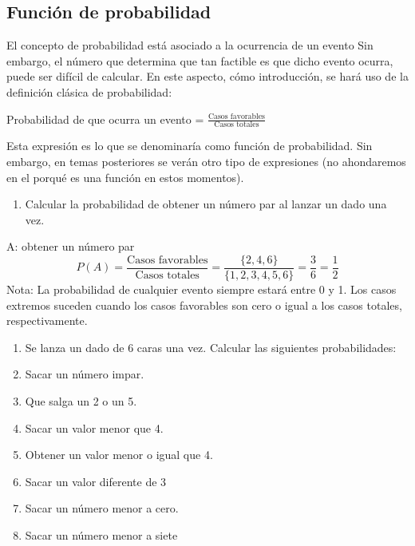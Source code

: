 \documentclass[
]{book}
\providecommand{\tightlist}{%
  \setlength{\itemsep}{0pt}\setlength{\parskip}{0pt}}
\begin{document}
\hypertarget{funciuxf3n-de-probabilidad}{%
\subsection{Función de probabilidad}\label{funciuxf3n-de-probabilidad}}

El concepto de probabilidad está asociado a la ocurrencia de un evento Sin embargo, el número que determina que tan factible es que dicho evento ocurra, puede ser difícil de calcular. En este aspecto, cómo introducción, se hará uso de la definición clásica de probabilidad:

Probabilidad de que ocurra un evento = \(\frac{\text{Casos favorables}}{\text{Casos totales}}\)

Esta expresión es lo que se denominaría como función de probabilidad. Sin embargo, en temas posteriores se verán otro tipo de expresiones (no ahondaremos en el porqué es una función en estos momentos).

\begin{enumerate}
\def\labelenumi{\arabic{enumi}.}
\tightlist
\item
  Calcular la probabilidad de obtener un número par al lanzar un dado una vez.
\end{enumerate}

A: obtener un número par
\[P(A) = \frac{\text{Casos favorables}}{\text{Casos totales}} = \frac{\lbrace 2,4,6 \rbrace}{\lbrace 1,2,3,4,5,6 \rbrace} = \frac{3}{6}= \frac{1}{2}\]
Nota: La probabilidad de cualquier evento siempre estará entre 0 y 1. Los casos extremos suceden cuando los casos favorables son cero o igual a los casos totales, respectivamente.

\begin{enumerate}
\def\labelenumi{\arabic{enumi}.}
\setcounter{enumi}{1}
\tightlist
\item
  Se lanza un dado de 6 caras una vez. Calcular las siguientes probabilidades:
\item
  Sacar un número impar.
\item
  Que salga un 2 o un 5.
\item
  Sacar un valor menor que 4.
\item
  Obtener un valor menor o igual que 4.
\item
  Sacar un valor diferente de 3
\item
  Sacar un número menor a cero.
\item
  Sacar un número menor a siete
\end{enumerate}
\end{document}
